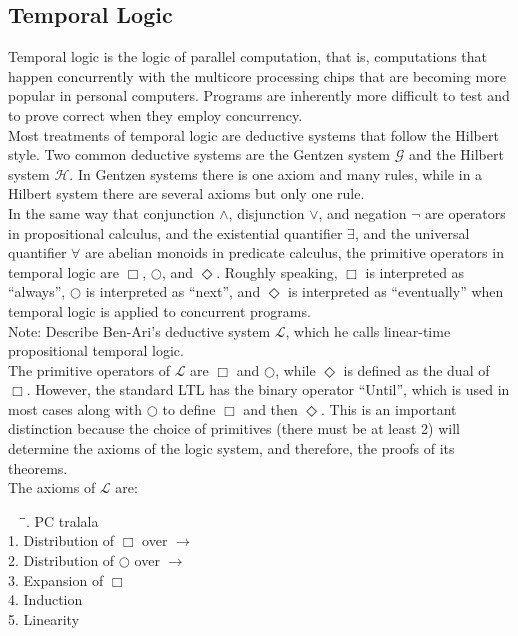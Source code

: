 \documentclass[fleqn, leqno]{article}
\newcommand{\lgap}{2pt}                             %
\newcommand{\next}{\bigcirc}
\newcommand{\event}{\Diamond}
\newcommand{\always}{\Box}
\newcommand{\all}{\forall}                          %
\newcommand{\ext}{\exists}                          %
\begin{document}
\subsection{Temporal Logic}

Temporal logic is the logic of parallel computation, that is, computations that happen concurrently
with the multicore processing chips that are becoming more popular in personal computers.
Programs are inherently more difficult to test and to prove correct when they employ concurrency.\\

Most treatments of temporal logic are deductive systems that follow the Hilbert style.
Two common deductive systems are the Gentzen system $\mathcal{G}$ and the Hilbert system $\mathcal{H}$. 
In Gentzen systems there is one axiom and many rules, while in a Hilbert system there are
several axioms but only one rule.\\

In the same way that conjunction $\land$, disjunction $\lor$, and negation $\neg$ are operators
in propositional calculus, and the existential quantifier $\ext$, and the universal quantifier $\all$
are abelian monoids in predicate calculus, the primitive operators in temporal logic are $\always$, $\next$,
and $\event$. Roughly speaking, $\always$ is interpreted as ``always'', $\next$ is interpreted as ``next'',
and $\event$ is interpreted as ``eventually'' when temporal logic is applied to concurrent programs. \cite{Ben2}\\

Note: Describe Ben-Ari's deductive system $\mathcal{L}$, which he calls linear-time propositional temporal logic.\\

The primitive operators of $\mathcal{L}$ are $\always$ and $\next$, while $\event$ is defined as the dual of $\always$.  However, the standard LTL has the binary operator ``Until'', which is used in most cases along with $\next$ to define $\always$ and then $\event$.  This is an important distinction because the choice of primitives (there must be at least 2) will determine the axioms of the logic system, and therefore, the proofs of its theorems.\\

The axioms of $\mathcal{L}$ are:
\begin{tabbing}
$\quad\;$\=\hspace{3in}\=. \> PC \> tralala\\[\lgap]
1. \> Distribution of $\always$ over $\rightarrow$\\[\lgap]
2. \> Distribution of $\next$ over $\rightarrow$\\[\lgap]
3. \> Expansion of $\always$\\[\lgap]
4. \> Induction\\[\lgap]
5. \> Linearity\\[\lgap]
\end{tabbing}
\end{document}
